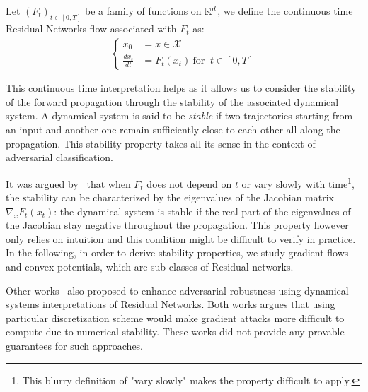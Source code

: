 \begin{definition}\label{def:flow}
Let $(F_{t})_{t\in[0,T]}$ be a family of functions on $\mathbb{R}^d$, we define the continuous time Residual Networks flow associated with $F_t$ as:
\begin{align*}\label{eq:resnet_c0}
  \left\{
    \begin{array}{ll}
    x_0 &= x\in\mathcal{X}\\
    \frac{dx_{t}}{dt} &= F_{{t}}(x_{t}) \  \text{for } \ t\in[0, T]
  \end{array}
  \right.
\end{align*}
\end{definition}

This continuous time interpretation helps as it allows us to consider the stability of the forward propagation through the stability of the associated dynamical system.
A dynamical system is said to be \emph{stable} if two trajectories starting from an input and another one remain sufficiently close to each other all along the propagation.
This stability property takes all its sense in the context of adversarial classification.

It was argued by~\citet{haber2017stable} that when $F_{t}$ does not depend on $t$ or vary slowly with time\footnote{This blurry definition of "vary slowly" makes the property difficult to apply.}, the stability can be characterized by the eigenvalues of the Jacobian matrix $\nabla_x F_{t}(x_t)$: 
the dynamical system is stable if the real part of the eigenvalues of the Jacobian stay negative throughout the propagation.
This property however only relies on intuition and this condition might be difficult to  verify in practice.
In the following, in order to derive stability properties, we study gradient flows and convex potentials, which are sub-classes of Residual networks.

Other works~\citep{huang2020adversarial,li2020implicit} also proposed to enhance adversarial robustness using dynamical systems interpretations of Residual Networks. Both works argues that using particular discretization scheme would make gradient attacks more difficult to compute due to numerical stability. These works did not provide any provable guarantees for such approaches.


